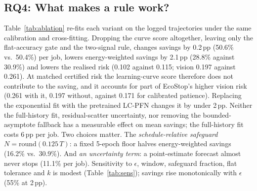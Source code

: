 \documentclass[3p,twocolumn,10pt]{elsarticle}
\theoremstyle{definition}
\begin{document}
\subsection{RQ4: What makes a rule work?}
\label{sec:ablation}
Table~\ref{tab:ablation} re-fits each variant on the logged trajectories under the same calibration and cross-fitting. Dropping the curve score altogether, leaving only the flat-accuracy gate and the two-signal rule, changes savings by 0.2\,pp (50.6\% vs.\ 50.4\%) per job, lowers energy-weighted savings by 2.1\,pp (28.8\% against 30.9\%) and lowers the realised risk (0.102 against 0.115; vision 0.197 against 0.261). At matched certified risk the learning-curve score therefore does not contribute to the saving, and it accounts for part of EcoStop's higher vision risk (0.261 with it, 0.197 without, against 0.171 for calibrated patience). Replacing the exponential fit with the pretrained LC-PFN changes it by under 2\,pp. Neither the full-history fit, residual-scatter uncertainty, nor removing the bounded-asymptote fallback has a measurable effect on mean savings; the full-history fit costs 6\,pp per job. Two choices matter. The \emph{schedule-relative safeguard} $N=\mathrm{round}(0.125\,T)$: a fixed 5-epoch floor halves energy-weighted savings (16.2\% vs.\ 30.9\%). And \emph{an uncertainty term}: a point-estimate forecast almost never stops (11.1\% per job). Sensitivity to $\epsilon$, window, safeguard fraction, flat tolerance and $k$ is modest (Table~\ref{tab:sens}); savings rise monotonically with $\epsilon$ (55\% at 2\,pp).
\end{document}
